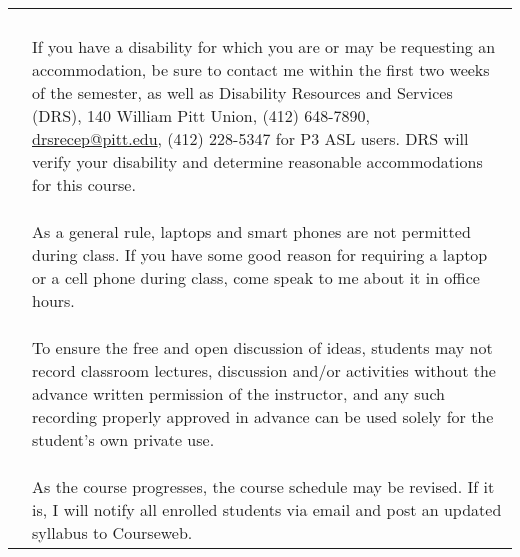 \begin{longtable}{l l}
\begin{minipage}{390pt}
	\end{minipage} \\
	\\
\s{disability}		&	\\
\s{services}		& \vspace{-24pt}		\\
&	\begin{minipage}{390pt}
If you have a disability for which you are or may be requesting an accommodation, be sure to contact me within the first two weeks of the semester, as well as Disability Resources and Services (DRS), 140 William Pitt Union, (412) 648-7890, \url{drsrecep@pitt.edu}, (412) 228-5347 for P3 ASL users. DRS will verify your disability and determine reasonable accommodations for this course.
	\end{minipage} \\
	\\
\s{laptop}		&	\\
\s{policy}		& \vspace{-24pt}		\\
&	\begin{minipage}{390pt}
As a general rule,  laptops and smart phones are not permitted during class.  If you have some good reason for requiring a laptop or a cell phone during class, come speak to me about it in office hours.
	\end{minipage} \\
	\\
	\newpage
\s{recording}		&	\\
\s{policy}		& \vspace{-24pt}		\\
&	\begin{minipage}{390pt}
To ensure the free and open discussion of ideas, students may not record classroom lectures, discussion and/or activities without the advance written permission of the instructor, and any such recording properly approved in advance can be used solely for the student's own private use.
	\end{minipage} \\
	\\
\s{schedule}		&	\\
\s{revision}		& \vspace{-24pt}		\\
&	\begin{minipage}{390pt}
As the course progresses, the course schedule may be revised.  If it is, I will notify all enrolled students via email and post an updated syllabus to Courseweb.
	\end{minipage} 
\end{longtable}

%
%

